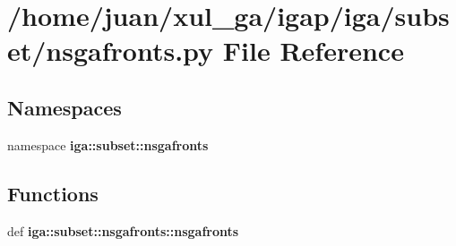 \section{/home/juan/xul\_\-ga/igap/iga/subset/nsgafronts.py File Reference}
\label{nsgafronts_8py}
\subsection*{Namespaces}
\begin{CompactItemize}
\item 
namespace {\bf iga::subset::nsgafronts}
\end{CompactItemize}
\subsection*{Functions}
\begin{CompactItemize}
\item 
def {\bf iga::subset::nsgafronts::nsgafronts}
\end{CompactItemize}

